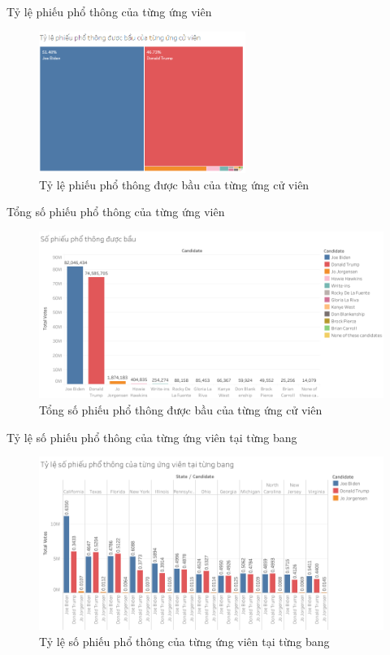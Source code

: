 \documentclass[10pt]{beamer}
\theoremstyle{remark}
\theoremstyle{definition}
\begin{document}
\begin{frame}{Tỷ lệ phiếu phổ thông của từng ứng viên}
	\begin{figure}[h!]
        \centering
        \includegraphics[width=0.6\textwidth]{Percentage_Total_Candidates_Tree_Chart.png}
        \caption{Tỷ lệ phiếu phổ thông được bầu của từng ứng cử viên}
    \end{figure}
\end{frame}

\begin{frame}{Tổng số phiếu phổ thông của từng ứng viên}
	\begin{figure}[h!]
        \centering
        \includegraphics[width=\textwidth]{Total_Popular_Votes_Candidates_Bar_Chart.png}
        \caption{Tổng số phiếu phổ thông được bầu của từng ứng cử viên}
    \end{figure}
\end{frame}

\begin{frame}{Tỷ lệ số phiếu phổ thông của từng ứng viên tại từng bang}
	\begin{figure}[h!]
        \centering
        \includegraphics[width=\textwidth]{Percentage_Popular_Votes_Candidates_by_States.png}
        \caption{Tỷ lệ số phiếu phổ thông của từng ứng viên tại từng bang}
    \end{figure}
\end{frame}
\end{document}
